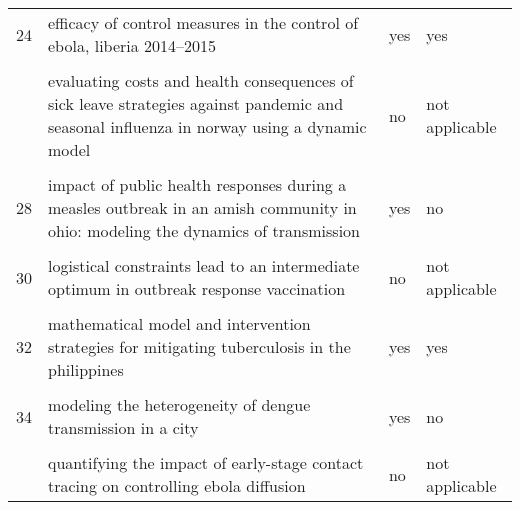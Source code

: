 \documentclass[
]{article}
\begin{document}
\begin{landscape}
\begin{longtable}{l>{\raggedright\arraybackslash}p{9cm}ll}
24 & efficacy of control measures in the control of ebola, liberia 2014–2015 & yes & yes\\
\cellcolor{gray!6}{25} & \cellcolor{gray!6}{epidemiology of the silent polio outbreak in rahat, israel, based on modeling of environmental surveillance data} & \cellcolor{gray!6}{yes} & \cellcolor{gray!6}{yes}\\
\addlinespace
26 & evaluating costs and health consequences of sick leave strategies against pandemic and seasonal influenza in norway using a dynamic model & no & not applicable\\
\cellcolor{gray!6}{27} & \cellcolor{gray!6}{evaluating vaccination strategies to control foot-and-mouth disease: a country comparison study} & \cellcolor{gray!6}{yes} & \cellcolor{gray!6}{no}\\
28 & impact of public health responses during a measles outbreak in an amish community in ohio: modeling the dynamics of transmission & yes & no\\
\cellcolor{gray!6}{29} & \cellcolor{gray!6}{initial validation of a simulation model for estimating the impact of serogroup a neisseria meningitidis vaccination in the african meningitis belt} & \cellcolor{gray!6}{yes} & \cellcolor{gray!6}{no}\\
30 & logistical constraints lead to an intermediate optimum in outbreak response vaccination & no & not applicable\\
\addlinespace
\cellcolor{gray!6}{31} & \cellcolor{gray!6}{manipulation of contact network structure and the impact on foot-and-mouth disease transmission} & \cellcolor{gray!6}{yes} & \cellcolor{gray!6}{no}\\
32 & mathematical model and intervention strategies for mitigating tuberculosis in the philippines & yes & yes\\
\cellcolor{gray!6}{33} & \cellcolor{gray!6}{measles outbreak response decision-making under uncertainty: a retrospective analysis} & \cellcolor{gray!6}{yes} & \cellcolor{gray!6}{yes}\\
34 & modeling the heterogeneity of dengue transmission in a city & yes & no\\
\cellcolor{gray!6}{35} & \cellcolor{gray!6}{modelling the large-scale yellow fever outbreak in luanda, angola, and the impact of vaccination} & \cellcolor{gray!6}{yes} & \cellcolor{gray!6}{yes}\\
\addlinespace
36 & quantifying the impact of early-stage contact tracing on controlling ebola diffusion & no & not applicable\\

\end{longtable}
\end{landscape}
\end{document}
